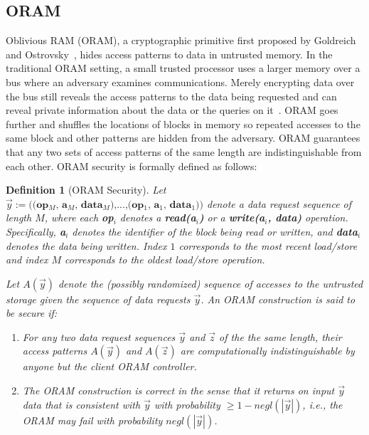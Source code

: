 \documentclass[letterpaper,twocolumn,10pt]{article}
\newtheorem{definition}[theorem]{Definition}
\begin{document}
\subsection{ORAM}
Oblivious RAM (ORAM), a cryptographic primitive first proposed by Goldreich and Ostrovsky~\cite{GO96}, hides access patterns to data in untrusted memory. In the traditional ORAM setting, a small trusted processor uses a larger memory over a bus where an adversary examines communications. Merely encrypting data over the bus still reveals the access patterns to the data being requested and can reveal private information about the data or the queries on it~\cite{IKK12}. ORAM goes further and shuffles the locations of blocks in memory so repeated accesses to the same block and other patterns are hidden from the adversary. ORAM guarantees that any two sets of access patterns of the same length are indistinguishable from each other. ORAM security is formally defined as follows:
\begin{definition}[ORAM Security\cite{SDS+13}]
Let $\overrightarrow{y}:=\textbf{((op$_M$, a$_M$, data$_M$),...,(op$_1$, a$_1$, data$_1$))}$ denote a data request sequence of length $M$, where each \textbf{op$_i$} denotes a \textbf{read(a$_i$)} or a \textbf{write(a$_i$, data)} operation. Specifically, \textbf{a$_i$} denotes the identifier of the block being read or written, and \textbf{data$_i$} denotes the data being written. Index $1$ corresponds to the most recent load/store and index $M$ corresponds to the oldest load/store operation.

Let $A(\overrightarrow{y})$ denote the (possibly randomized) sequence of accesses to the untrusted storage given the sequence of data requests $\overrightarrow{y}$. An ORAM construction is said to be secure if:
\begin{enumerate}
\setlength\itemsep{0pt}
\item For any two data request sequences $\overrightarrow{y}$ and $\overrightarrow{z}$ of the the same length, their access patterns $A(\overrightarrow{y})$ and $A(\overrightarrow{z})$ are computationally indistinguishable by anyone but the client ORAM controller.

\item The ORAM construction is correct in the sense that it returns on input $\overrightarrow{y}$ data that is consistent with $\overrightarrow{y}$ with probability $\geq 1 - \textit{negl}(|\overrightarrow{y}|)$, i.e., the ORAM may fail with probability $\textit{negl}(|\overrightarrow{y}|)$.
\end{enumerate}
\end{definition}
\end{document}
